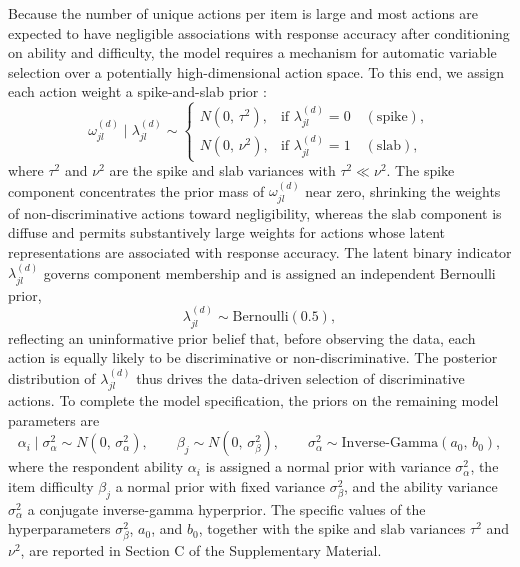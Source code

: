 \documentclass[A4paper,11pt]{article}
\begin{document}
Because the number of unique actions per item is large and most actions are expected to have negligible associations with response accuracy after conditioning on ability and difficulty, the model requires a mechanism for automatic variable selection over a potentially high-dimensional action space. To this end, we assign each action weight a spike-and-slab prior \citep{mitchellbeauchamp1988, george1993variable}:
\begin{equation}\label{eq:spike_slab}
\omega_{jl}^{(d)}\mid \lambda_{jl}^{(d)}
\sim
\begin{cases}
N(0,\,\tau^2), & \text{if } \lambda_{jl}^{(d)}=0 \quad (\text{spike}),\\[4pt]
N(0,\,\nu^2), & \text{if } \lambda_{jl}^{(d)}=1 \quad (\text{slab}),
\end{cases}
\end{equation}
where $\tau^2$ and $\nu^2$ are the spike and slab variances with $\tau^2 \ll \nu^2$. The spike component concentrates the prior mass of $\omega_{jl}^{(d)}$ near zero, shrinking the weights of non-discriminative actions toward negligibility, whereas the slab component is diffuse and permits substantively large weights for actions whose latent representations are associated with response accuracy. The latent binary indicator $\lambda_{jl}^{(d)}$ governs component membership and is assigned an independent Bernoulli prior,
\begin{equation}\label{eq:lambda_prior}
\lambda_{jl}^{(d)}\sim \mathrm{Bernoulli}(0.5),
\end{equation}
reflecting an uninformative prior belief that, before observing the data, each action is equally likely to be discriminative or non-discriminative. The posterior distribution of $\lambda_{jl}^{(d)}$ thus drives the data-driven selection of discriminative actions. To complete the model specification, the priors on the remaining model parameters are
\begin{equation}\label{eq:remaining_priors}
\alpha_i \mid \sigma_{\alpha}^{2} \sim N\!\left(0,\,\sigma_{\alpha}^{2}\right),
\qquad
\beta_j \sim N\!\left(0,\,\sigma_{\beta}^{2}\right),
\qquad
\sigma_{\alpha}^{2} \sim \text{Inverse-Gamma}\!\left(a_0,\,b_0\right),
\end{equation}
where the respondent ability $\alpha_i$ is assigned a normal prior with variance $\sigma_{\alpha}^{2}$, the item difficulty $\beta_j$ a normal prior with fixed variance $\sigma_{\beta}^{2}$, and the ability variance $\sigma_{\alpha}^{2}$ a conjugate inverse-gamma hyperprior. The specific values of the hyperparameters $\sigma_{\beta}^{2}$, $a_0$, and $b_0$, together with the spike and slab variances $\tau^2$ and $\nu^2$, are reported in Section C of the Supplementary Material.
\end{document}
